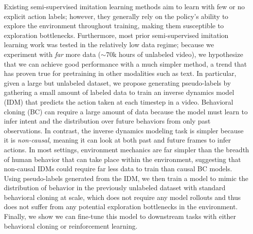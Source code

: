 Existing semi-supervised imitation learning methods aim to learn with few or no explicit action labels; however, they generally rely on the policy's ability to explore the environment throughout training, making them susceptible to exploration bottlenecks. \cite{ng2000algorithms, torabi2019recent, ho2016generative, torabi2018behavioral, liu2018imitation}
Furthermore, most prior semi-supervised imitation learning work was tested in the relatively low data regime; because we experiment with \textit{far} more data ($\sim$70k hours of unlabeled video), we hypothesize that we can achieve good performance with a much simpler method, a trend that has proven true for pretraining in other modalities such as  text.\cite{brown2020language}
In particular, given a large but unlabeled dataset, we propose generating pseudo-labels by gathering a small amount of labeled data to train an inverse dynamics model (IDM) that predicts the action taken at each timestep in a video.
Behavioral cloning (BC) can require a large amount of data because the model must learn to infer intent and the distribution over future behaviors from only past observations.
In contrast, the inverse dynamics modeling task is simpler because it is \emph{non-causal}, meaning it can look at both past and future frames to infer actions.
In most settings, environment mechanics are far simpler than the breadth of human behavior that can take place within the environment, suggesting that non-causal IDMs could require far less data to train than causal BC models.
Using pseudo-labels generated from the IDM, we then train a model to mimic the distribution of behavior in the previously unlabeled dataset with standard behavioral cloning at scale, which does not require any model rollouts and thus does not suffer from any potential exploration bottlenecks in the environment.
Finally, we show we can fine-tune this model to downstream tasks with either behavioral cloning or reinforcement learning.

